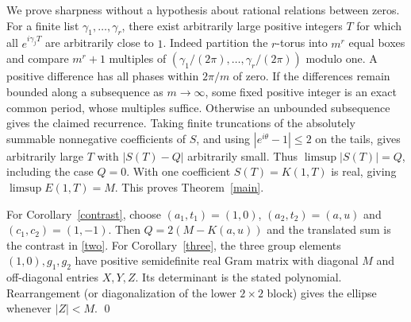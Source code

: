 \documentclass[11pt]{article}
\begin{document}
We prove sharpness without a hypothesis about rational relations between zeros. For a finite list $\gamma_1,\ldots,\gamma_r$, there exist arbitrarily large positive integers $T$ for which all $e^{i\gamma_j T}$ are arbitrarily close to $1$. Indeed partition the $r$-torus into $m^r$ equal boxes and compare $m^r+1$ multiples of $(\gamma_1/(2\pi),\ldots,\gamma_r/(2\pi))$ modulo one. A positive difference has all phases within $2\pi/m$ of zero. If the differences remain bounded along a subsequence as $m\to\infty$, some fixed positive integer is an exact common period, whose multiples suffice. Otherwise an unbounded subsequence gives the claimed recurrence. Taking finite truncations of the absolutely summable nonnegative coefficients of $S$, and using $|e^{i\theta}-1|\le2$ on the tails, gives arbitrarily large $T$ with $|S(T)-Q|$ arbitrarily small. Thus $\limsup|S(T)|=Q$, including the case $Q=0$. With one coefficient $S(T)=K(1,T)$ is real, giving $\limsup E(1,T)=M$. This proves Theorem~\ref{main}.

For Corollary~\ref{contrast}, choose $(a_1,t_1)=(1,0)$, $(a_2,t_2)=(a,u)$ and $(c_1,c_2)=(1,-1)$. Then $Q=2(M-K(a,u))$ and the translated sum is the contrast in \eqref{two}. For Corollary~\ref{three}, the three group elements $(1,0),g_1,g_2$ have positive semidefinite real Gram matrix with diagonal $M$ and off-diagonal entries $X,Y,Z$. Its determinant is the stated polynomial. Rearrangement (or diagonalization of the lower $2\times2$ block) gives the ellipse whenever $|Z|<M$. \qed
\end{document}
